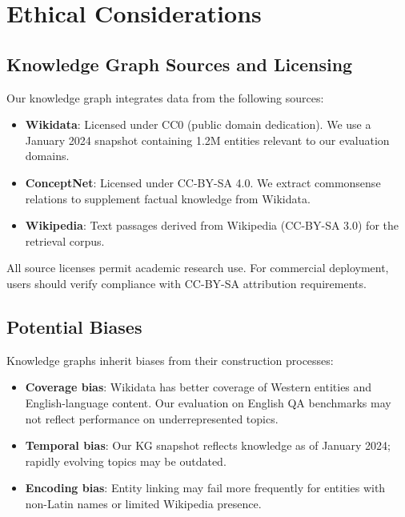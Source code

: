 \documentclass[10pt,twocolumn]{article}
\begin{document}
\section{Ethical Considerations}
\label{sec:ethics}

\subsection{Knowledge Graph Sources and Licensing}

Our knowledge graph integrates data from the following sources:

\begin{itemize}
    \item \textbf{Wikidata}: Licensed under CC0 (public domain dedication). We use a January 2024 snapshot containing 1.2M entities relevant to our evaluation domains.
    \item \textbf{ConceptNet}: Licensed under CC-BY-SA 4.0. We extract commonsense relations to supplement factual knowledge from Wikidata.
    \item \textbf{Wikipedia}: Text passages derived from Wikipedia (CC-BY-SA 3.0) for the retrieval corpus.
\end{itemize}

All source licenses permit academic research use. For commercial deployment, users should verify compliance with CC-BY-SA attribution requirements.

\subsection{Potential Biases}

Knowledge graphs inherit biases from their construction processes:

\begin{itemize}
    \item \textbf{Coverage bias}: Wikidata has better coverage of Western entities and English-language content. Our evaluation on English QA benchmarks may not reflect performance on underrepresented topics.
    \item \textbf{Temporal bias}: Our KG snapshot reflects knowledge as of January 2024; rapidly evolving topics may be outdated.
    \item \textbf{Encoding bias}: Entity linking may fail more frequently for entities with non-Latin names or limited Wikipedia presence.
\end{itemize}
\end{document}
